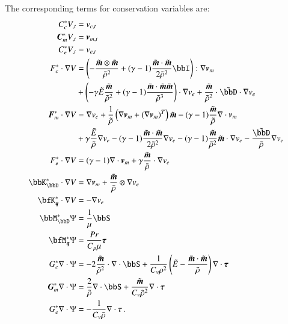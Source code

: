 \documentclass[preprint,12pt]{elsarticle}
\begin{document}
The corresponding terms for conservation variables are:
\begin{align*}
C^*_cV_{,t}&=v_{c,t}\\
\bfC^*_mV_{,t}&=\bfv_{m,t}\\
C^*_eV_{,t}&=v_{e,t}\\
%
F^*_c\cdot\Grad V&=\LRp{-\frac{\tilde\bfm\otimes\tilde\bfm}{\tilde\rho^2}+(\gamma-1)\frac{\tilde\bfm\cdot\tilde\bfm}{2\tilde\rho^2}\bbI}:\Grad\bfv_m\\
&+\LRp{-\gamma\tilde E\frac{\tilde\bfm}{\tilde\rho^2}+(\gamma-1)\frac{\tilde\bfm\cdot\tilde\bfm\tilde\bfm}{\tilde\rho^3}}\cdot\Grad v_e
+\frac{\tilde\bfm}{\tilde\rho^2}\cdot\tilde\bbD\cdot\Grad v_e
\\
\bfF^*_m\cdot\Grad V&=\Grad v_c
+\frac{1}{\tilde\rho}\LRp{\Grad\bfv_m+(\Grad\bfv_m)^T}\tilde\bfm-(\gamma-1)\frac{\tilde\bfm}{\tilde\rho}\Div\bfv_m\\
&+\gamma\frac{\tilde E}{\tilde\rho}\Grad v_e-(\gamma-1)\frac{\tilde\bfm\cdot\tilde\bfm}{2\tilde\rho^2}\Grad v_e
-(\gamma-1)\frac{\tilde\bfm}{\tilde\rho^2}\tilde\bfm\cdot\Grad v_e
-\frac{\tilde\bbD}{\tilde\rho}\Grad v_e
\\
F^*_e\cdot\Grad V&=(\gamma-1)\Div\bfv_m
+\gamma\frac{\tilde\bfm}{\tilde\rho}\cdot\Grad v_e
\\
%
\bbK^*_\bbD\cdot\Grad V&=\Grad\bfv_m+\frac{\tilde\bfm}{\tilde\rho}\otimes\Grad v_e\\
\bfK^*_{\bfq}\cdot\Grad V&=-\Grad v_e\\
%
\bbM^*_\bbD\Psi&=\frac{1}{\mu}\bbS\\
\bfM^*_{\bfq}\Psi&=\frac{Pr}{C_p\mu}\bftau\\
%
G^*_c\Div\Psi&=-2\frac{\tilde\bfm}{\tilde\rho^2}\cdot\Div\bbS
+\frac{1}{C_v\rho^2}\LRp{\tilde E
-\frac{\tilde\bfm\cdot\tilde\bfm}{\tilde\rho}}\Div\bftau
\\
\bfG^*_m\Div\Psi&=\frac{2}{\tilde\rho}\Div\bbS+\frac{\tilde\bfm}{C_v\tilde\rho^2}\Div\bftau
\\
G^*_e\Div\Psi&=-\frac{1}{C_v\tilde\rho}\Div\bftau\,.
\end{align*}
\end{document}

